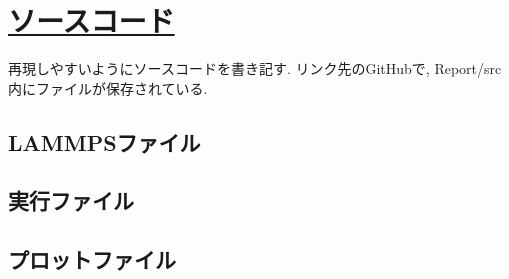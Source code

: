 \chapter{\href{https://github.com/m-agnet/Report.git}{ソースコード}}

再現しやすいようにソースコードを書き記す. リンク先のGitHubで, Report/src内にファイルが保存されている.

\section{LAMMPSファイル}



\section{実行ファイル}




\section{プロットファイル}


